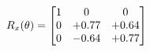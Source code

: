 \documentclass[preview]{standalone}
\begin{document}
\begin{align*}
\special{dvisvgm:raw <g id='unique000'>}R_{x}(\theta) = \begin{bmatrix}1 & 0 & 0 \\0 & +0.77 & +0.64 \\0 & -0.64 & +0.77\end{bmatrix}\special{dvisvgm:raw </g>}
\end{align*}
\end{document}
